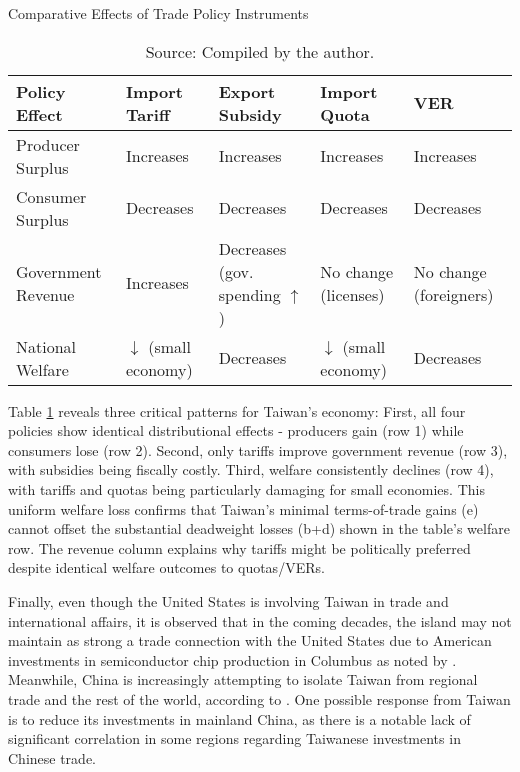 \documentclass{article}
\begin{document}
\begin{table}[h]
    \centering
    \caption{Comparative Effects of Trade Policy Instruments}
    \begin{tabular}{@{}lp{2cm}p{2cm}p{2cm}p{2cm}@{}}
    \toprule
    \textbf{Policy Effect} & \textbf{Import Tariff} & \textbf{Export Subsidy} & \textbf{Import Quota} & \textbf{VER} \\ 
    \midrule
    Producer Surplus & Increases & Increases & Increases & Increases \\ 
    \addlinespace[0.3cm]
    Consumer Surplus & Decreases & Decreases & Decreases & Decreases \\
    \addlinespace[0.3cm]
    Government Revenue & Increases & \raggedright Decreases (gov. spending $\uparrow$) & No change (licenses) & No change (foreigners) \\
    \addlinespace[0.3cm]
    National Welfare & \raggedright $\downarrow$ (small economy) & Decreases & \raggedright $\downarrow$ (small economy) & Decreases \\ 
    \bottomrule
    \end{tabular}
    \caption*{Source: Compiled by the author.}
    \label{tab:tradepolicy}
\end{table}

Table \ref{tab:tradepolicy} reveals three critical patterns for Taiwan's economy: First, all four policies show identical distributional effects - producers gain (row 1) while consumers lose (row 2). Second, only tariffs improve government revenue (row 3), with subsidies being fiscally costly. Third, welfare consistently declines (row 4), with tariffs and quotas being particularly damaging for small economies. This uniform welfare loss confirms that Taiwan's minimal terms-of-trade gains (e) cannot offset the substantial deadweight losses (b+d) shown in the table's welfare row. The revenue column explains why tariffs might be politically preferred despite identical welfare outcomes to quotas/VERs.

Finally, even though the United States is involving Taiwan in trade and international affairs, it is observed that in the coming decades, the island may not maintain as strong a trade connection with the United States due to American investments in semiconductor chip production in Columbus as noted by \cite{king_intel_chip_hub}. Meanwhile, China is increasingly attempting to isolate Taiwan from regional trade and the rest of the world, according to \cite{feddersen_china_strategies_towards_taiwan}. One possible response from Taiwan is to reduce its investments in mainland China, as there is a notable lack of significant correlation in some regions regarding Taiwanese investments in Chinese trade.
\end{document}
